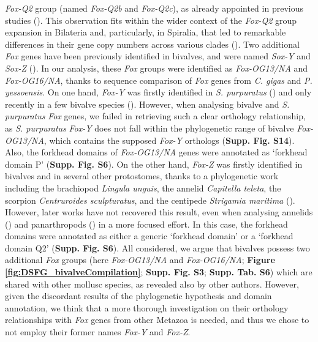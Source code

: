 \documentclass[../main.tex]{subfiles}
\begin{document}
\textit{Fox-Q2} group (named \textit{Fox-Q2b} and \textit{Fox-Q2c}), as already appointed in previous studies (\textbf{\cite{yang2014phylogeny,wu2020identification}}). This observation fits within the wider context of the \textit{Fox-Q2} group expansion in Bilateria and, particularly, in Spiralia, that led to remarkable differences in their gene copy numbers across various clades (\textbf{\cite{seudre2022fox}}). Two additional \textit{Fox} genes have been previously identified in bivalves, and were named \textit{Sox-Y} and \textit{Sox-Z} (\textbf{\cite{yang2014phylogeny,wu2020identification}}). In our analysis, these \textit{Fox} groups were identified as \textit{Fox-OG13/NA} and \textit{Fox-OG16/NA}, thanks to sequence comparison of \textit{Fox} genes from \textit{C. gigas} and \textit{P. yessoensis}. On one hand, \textit{Fox-Y} was firstly identified in \textit{S. purpuratus} (\textbf{\cite{tu2006sea}}) and only recently in a few bivalve species (\textbf{\cite{yang2014phylogeny,wu2020identification}}). However, when analysing bivalve and \textit{S. purpuratus} \textit{Fox} genes, we failed in retrieving such a clear orthology relationship, as \textit{S. purpuratus} \textit{Fox-Y} does not fall within the phylogenetic range of bivalve \textit{Fox-OG13/NA}, which contains the supposed \textit{Fox-Y} orthologs (\textbf{Supp. Fig. S14}). Also, the forkhead domains of \textit{Fox-OG13/NA} genes were annotated as ‘forkhead domain P’ (\textbf{Supp. Fig. S6}). On the other hand, \textit{Fox-Z} was firstly identified in bivalves and in several other protostomes, thanks to a phylogenetic work including the brachiopod \textit{Lingula unguis}, the annelid \textit{Capitella teleta}, the scorpion \textit{Centruroides sculpturatus}, and the centipede \textit{Strigamia maritima} (\textbf{\cite{wu2020identification}}). However, later works have not recovered this result, even when analysing annelids (\textbf{\cite{seudre2022fox}}) and panarthropods (\textbf{\cite{schomburg2022phylogenetic}}) in a more focused effort. In this case, the forkhead domains were annotated as either a generic ‘forkhead domain’ or a ‘forkhead domain Q2’ (\textbf{Supp. Fig. S6}). All considered, we argue that bivalves possess two additional \textit{Fox} groups (here \textit{Fox-OG13/NA} and \textit{Fox-OG16/NA}; \textbf{Figure \ref{fig:DSFG_bivalveCompilation}}; \textbf{Supp. Fig. S3}; \textbf{Supp. Tab. S6}) which are shared with other mollusc species, as revealed also by other authors. However, given the discordant results of the phylogenetic hypothesis and domain annotation, we think that a more thorough investigation on their orthology relationships with \textit{Fox} genes from other Metazoa is needed, and thus we chose to not employ their former names \textit{Fox-Y} and \textit{Fox-Z}.
\end{document}
